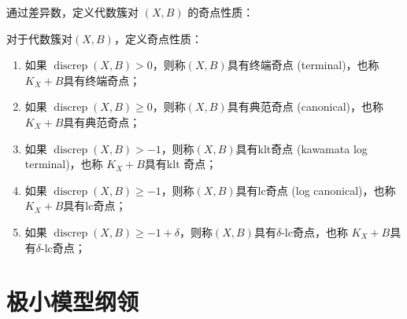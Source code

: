 通过差异数，定义代数簇对 $(X,B)$ 的奇点性质：
\begin{definition}
  对于代数簇对$(X,B)$，定义奇点性质：
  \begin{enumerate}
    \item 如果 $\operatorname{discrep}(X,B)>0$，则称$(X,B) $具有终端奇点 (terminal)，也称 $K_{X}+B$具有终端奇点； 
    \item 如果 $\operatorname{discrep}(X,B)\geqslant 0$，则称$(X,B) $具有典范奇点 (canonical)，也称 $K_{X}+B$具有典范奇点； 
    \item 如果 $\operatorname{discrep}(X,B)>-1$，则称$(X,B) $具有klt奇点 (kawamata log terminal)，也称 $K_{X}+B$具有klt 奇点； 
    \item 如果 $\operatorname{discrep}(X,B)\geqslant -1$，则称$(X,B) $具有lc奇点 (log canonical)，也称 $K_{X}+B$具有lc奇点； 
    \item 如果 $\operatorname{discrep}(X,B)\geqslant -1+\delta$，则称$(X,B) $具有$\delta$-lc奇点，也称 $K_{X}+B$具有$\delta$-lc奇点； 
  \end{enumerate}
\end{definition}

\section{极小模型纲领}

